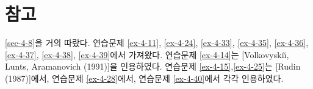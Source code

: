 \section{참고}

\ref{sec-4-8}을 거의 따랐다.
연습문제 \ref{ex-4-11}, \ref{ex-4-24}, \ref{ex-4-33}, \ref{ex-4-35}, \ref{ex-4-36},
\ref{ex-4-37}, \ref{ex-4-38}, \ref{ex-4-39}\는 [Flanigan (1972)]에서 가져왔다.
연습문제 \ref{ex-4-14}는 [Volkovyski\u{\i}, Lunts, Aramanovich (1991)]을 인용하였다.
연습문제 \ref{ex-4-15},\ref{ex-4-25}는 [Rudin (1987)]에서,
연습문제 \ref{ex-4-28}에서,
연습문제 \ref{ex-4-40}에서 각각 인용하였다.











